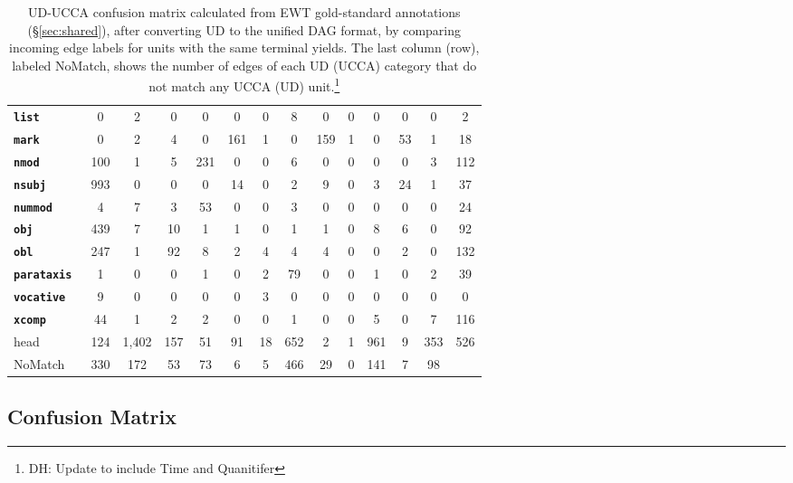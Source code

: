 \documentclass[11pt,a4paper]{article}
\newcommand{\daniel}[1]{\footnote{\color{blue}DH: #1}}
\begin{document}
\begin{table}[t]
\begin{tabular}{l|cccccccccccc|c}
\bf \tt \tiny list & 0 & 2 & 0 & 0 & 0 & 0 & 8 & 0 & 0 & 0 & 0 & 0 & 2 \\
\bf \tt \tiny mark & 0 & 2 & 4 & 0 & 161 & 1 & 0 & 159 & 1 & 0 & 53 & 1 & 18 \\
\bf \tt \tiny nmod & 100 & 1 & 5 & 231 & 0 & 0 & 6 & 0 & 0 & 0 & 0 & 3 & 112 \\
\bf \tt \tiny nsubj & 993 & 0 & 0 & 0 & 14 & 0 & 2 & 9 & 0 & 3 & 24 & 1 & 37 \\
\bf \tt \tiny nummod & 4 & 7 & 3 & 53 & 0 & 0 & 3 & 0 & 0 & 0 & 0 & 0 & 24 \\
\bf \tt \tiny obj & 439 & 7 & 10 & 1 & 1 & 0 & 1 & 1 & 0 & 8 & 6 & 0 & 92 \\
\bf \tt \tiny obl & 247 & 1 & 92 & 8 & 2 & 4 & 4 & 4 & 0 & 0 & 2 & 0 & 132 \\
\bf \tt \tiny parataxis & 1 & 0 & 0 & 1 & 0 & 2 & 79 & 0 & 0 & 1 & 0 & 2 & 39 \\
\bf \tt \tiny vocative & 9 & 0 & 0 & 0 & 0 & 3 & 0 & 0 & 0 & 0 & 0 & 0 & 0 \\
\bf \tt \tiny xcomp & 44 & 1 & 2 & 2 & 0 & 0 & 1 & 0 & 0 & 5 & 0 & 7 & 116 \\
\hline
head & 124 & 1,402 & 157 & 51 & 91 & 18 & 652 & 2 & 1 & 961 & 9 & 353 & 526 \\
{\sc NoMatch} & 330 & 172 & 53 & 73 & 6 & 5 & 466 & 29 & 0 & 141 & 7 & 98
\end{tabular}
\caption{UD-UCCA confusion matrix calculated from EWT
gold-standard annotations (\S\ref{sec:shared}),
after converting UD to the unified DAG format,
by comparing incoming edge labels for units with the same terminal yields.
The last column (row), labeled {\sc NoMatch}, shows the number of edges of each UD (UCCA) category
that do not match any UCCA (UD) unit.\daniel{Update to include Time and Quanitifer}
\label{tab:confusion_matrix}}
\end{table}

\subsection{Confusion Matrix}\label{sec:confusion}
\end{document}
